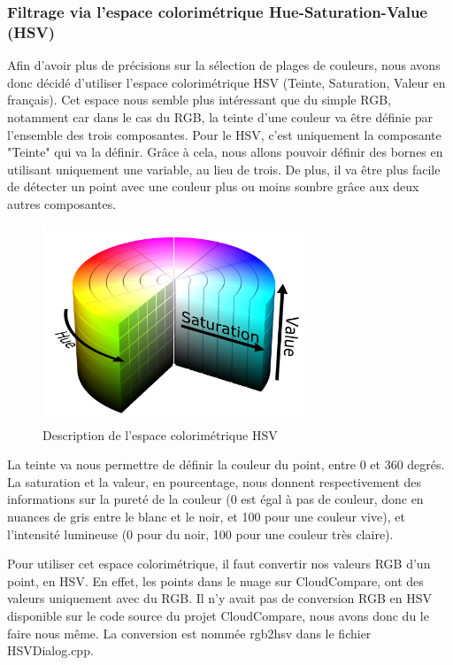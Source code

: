 \documentclass[12pt,titlepage,french]{article}
\begin{document}
\subsubsection{Filtrage via l'espace colorimétrique Hue-Saturation-Value (HSV)}

Afin d'avoir plus de précisions sur la sélection de plages de couleurs, nous avons donc décidé d'utiliser l'espace colorimétrique HSV (Teinte, Saturation, Valeur en français). Cet espace nous semble plus intéressant que du simple RGB, notamment car dans le cas du RGB, la teinte d'une couleur va être définie par l'ensemble des trois composantes. Pour le HSV, c'est uniquement la composante "Teinte" qui va la définir. Grâce à cela, nous allons pouvoir définir des bornes en utilisant uniquement une variable, au lieu de trois. De plus, il va être plus facile de détecter un point avec une couleur plus ou moins sombre grâce aux deux autres composantes.

\begin{figure}[H]
\center
\includegraphics[width=0.7\textwidth]{./img/HSV.png}
\caption{\label{} Description de l'espace colorimétrique HSV}
\end{figure}

 La teinte va nous permettre de définir la couleur du point, entre 0 et 360 degrés. La saturation et la valeur, en pourcentage, nous donnent respectivement des informations sur la pureté de la couleur (0 est égal à pas de couleur, donc en nuances de gris entre le blanc et le noir, et 100 pour une couleur vive), et l'intensité lumineuse (0 pour du noir, 100 pour une couleur très claire). \newline

Pour utiliser cet espace colorimétrique, il faut convertir nos valeurs RGB d'un point, en HSV. En effet, les points dans le nuage sur CloudCompare, ont des valeurs uniquement avec du RGB. Il n'y avait pas de conversion RGB en HSV disponible sur le code source du projet CloudCompare, nous avons donc du le faire nous même. La conversion est nommée rgb2hsv dans le fichier HSVDialog.cpp. \newline
\end{document}

